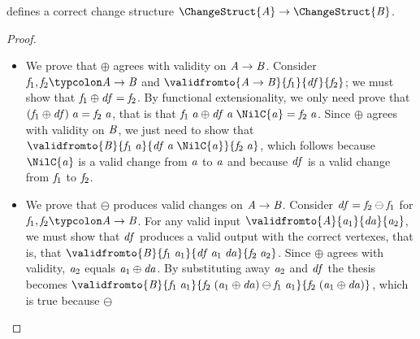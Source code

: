 \begin{lemma}
   defines a correct change structure \ensuremath{\ChangeStruct{\Conid{A}}\to \ChangeStruct{\Conid{B}}}.
\end{lemma}
\begin{proof}

  \begin{itemize}
  \item We prove that \ensuremath{\oplus } agrees with validity on \ensuremath{\Conid{A}\to \Conid{B}}. Consider \ensuremath{\Varid{f}_{1},\Varid{f}_{2}\typcolon\Conid{A}\to \Conid{B}} and \ensuremath{\validfromto{\Conid{A}\to \Conid{B}}{\Varid{f}_{1}}{\Varid{df}}{\Varid{f}_{2}}}; we must show that \ensuremath{\Varid{f}_{1}\oplus \Varid{df}\mathrel{=}\Varid{f}_{2}}. By functional extensionality, we only need prove that \ensuremath{(\Varid{f}_{1}\oplus \Varid{df})\;\Varid{a}\mathrel{=}\Varid{f}_{2}\;\Varid{a}}, that is that \ensuremath{\Varid{f}_{1}\;\Varid{a}\oplus \Varid{df}\;\Varid{a}\;\NilC{\Varid{a}}\mathrel{=}\Varid{f}_{2}\;\Varid{a}}. Since
    \ensuremath{\oplus } agrees with validity on \ensuremath{\Conid{B}}, we just need to show that \ensuremath{\validfromto{\Conid{B}}{\Varid{f}_{1}\;\Varid{a}}{\Varid{df}\;\Varid{a}\;\NilC{\Varid{a}}}{\Varid{f}_{2}\;\Varid{a}}}, which follows because \ensuremath{\NilC{\Varid{a}}} is a valid
    change from \ensuremath{\Varid{a}} to \ensuremath{\Varid{a}} and because \ensuremath{\Varid{df}} is a valid change from \ensuremath{\Varid{f}_{1}} to \ensuremath{\Varid{f}_{2}}.
  \item We prove that \ensuremath{\ominus } produces valid changes on \ensuremath{\Conid{A}\to \Conid{B}}. Consider
    \ensuremath{\Varid{df}\mathrel{=}\Varid{f}_{2}\ominus \Varid{f}_{1}} for \ensuremath{\Varid{f}_{1},\Varid{f}_{2}\typcolon\Conid{A}\to \Conid{B}}. For any valid input \ensuremath{\validfromto{\Conid{A}}{\Varid{a}_{1}}{\Varid{da}}{\Varid{a}_{2}}}, we must show that \ensuremath{\Varid{df}} produces a valid output with the correct
    vertexes, that is, that \ensuremath{\validfromto{\Conid{B}}{\Varid{f}_{1}\;\Varid{a}_{1}}{\Varid{df}\;\Varid{a}_{1}\;\Varid{da}}{\Varid{f}_{2}\;\Varid{a}_{2}}}. Since
    \ensuremath{\oplus } agrees with validity, \ensuremath{\Varid{a}_{2}} equals \ensuremath{\Varid{a}_{1}\oplus \Varid{da}}. By substituting
    away \ensuremath{\Varid{a}_{2}} and \ensuremath{\Varid{df}} the thesis becomes \ensuremath{\validfromto{\Conid{B}}{\Varid{f}_{1}\;\Varid{a}_{1}}{\Varid{f}_{2}\;(\Varid{a}_{1}\oplus \Varid{da})\ominus \Varid{f}_{1}\;\Varid{a}_{1}}{\Varid{f}_{2}\;(\Varid{a}_{1}\oplus \Varid{da})}}, which is true because \ensuremath{\ominus }

\end{itemize}
\end{proof}
